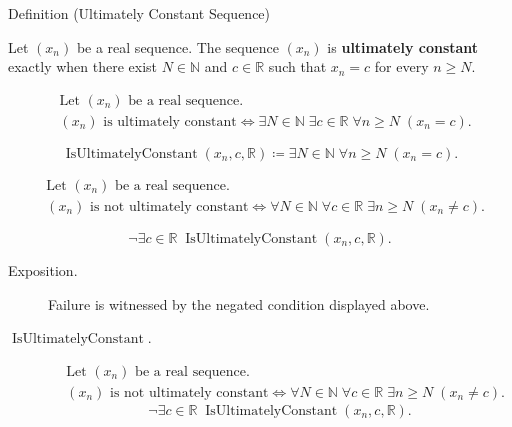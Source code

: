 \begin{definitionbox}{Definition (Ultimately Constant Sequence)}
\begin{definition}
\label{def:ultimately-constant-sequence}
Let $(x_n)$ be a real sequence. The sequence $(x_n)$ is
\textbf{ultimately constant} exactly when there exist $N \in \mathbb{N}$ and
$c \in \mathbb{R}$ such that $x_n = c$ for every $n \ge N$.
\end{definition}
\end{definitionbox}

\begin{remark*}
\[
\begin{aligned}
&\text{Let } (x_n) \text{ be a real sequence.}\\
&(x_n) \text{ is ultimately constant}
\Longleftrightarrow
\exists N \in \mathbb{N}\;
\exists c \in \mathbb{R}\;
\forall n \ge N\;(x_n = c).
\end{aligned}
\]
\end{remark*}

\begin{remark*}
\[
\operatorname{IsUltimatelyConstant}(x_n,c,\mathbb{R})
\coloneqq
\exists N \in \mathbb{N}\;
\forall n \ge N\;(x_n = c).
\]
\end{remark*}

\begin{remark*}
\[
\begin{aligned}
&\text{Let } (x_n) \text{ be a real sequence.}\\
&(x_n) \text{ is not ultimately constant}
\Longleftrightarrow
\forall N \in \mathbb{N}\;
\forall c \in \mathbb{R}\;
\exists n \ge N\;(x_n \neq c).
\end{aligned}
\]
\end{remark*}

\begin{remark*}
\[
\neg\exists c \in \mathbb{R}\;
\operatorname{IsUltimatelyConstant}(x_n,c,\mathbb{R}).
\]
\end{remark*}
\begin{remark*}
\begin{description}
  \item[Exposition.]
Failure is witnessed by the negated condition displayed above.
  \item[\(\operatorname{IsUltimatelyConstant}.\)]
\[
\begin{aligned}
&\text{Let } (x_n) \text{ be a real sequence.}\\
&(x_n) \text{ is not ultimately constant}
\Longleftrightarrow
\forall N \in \mathbb{N}\;
\forall c \in \mathbb{R}\;
\exists n \ge N\;(x_n \neq c).
\end{aligned}
\]
\[
\neg\exists c \in \mathbb{R}\;
\operatorname{IsUltimatelyConstant}(x_n,c,\mathbb{R}).
\]
\end{description}
\end{remark*}

